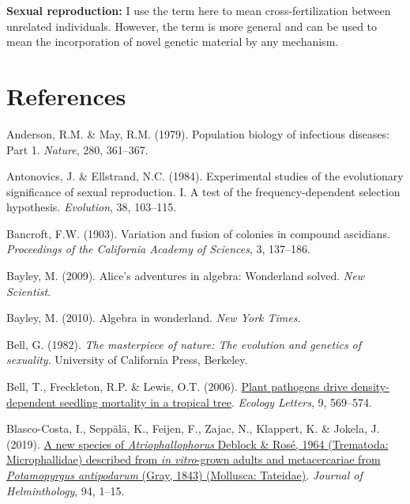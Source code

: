 \documentclass[
  letterpaper,
]{book}
\newlength{\cslhangindent}
\newenvironment{CSLReferences}[2] %
 {\begin{list}{}{%
  \setlength{\itemindent}{0pt}
  \setlength{\leftmargin}{0pt}
  \setlength{\parsep}{0pt}
  \ifodd #1
   \setlength{\leftmargin}{\cslhangindent}
   \setlength{\itemindent}{-1\cslhangindent}
  \fi
  \setlength{\itemsep}{#2\baselineskip}}}
 {\end{list}}
\begin{document}
\textbf{Sexual reproduction:} I use the term here to mean
cross-fertilization between unrelated individuals. However, the term is
more general and can be used to mean the incorporation of novel genetic
material by any mechanism.


\chapter*{References}\label{references}


\label{refs}
\begin{CSLReferences}{1}{0}
Anderson, R.M. \& May, R.M. (1979). Population biology of infectious
diseases: Part 1. \emph{Nature}, 280, 361--367.

Antonovics, J. \& Ellstrand, N.C. (1984). Experimental studies of the
evolutionary significance of sexual reproduction. I. A test of the
frequency-dependent selection hypothesis. \emph{Evolution}, 38,
103--115.

Bancroft, F.W. (1903). Variation and fusion of colonies in compound
ascidians. \emph{Proceedings of the {California Academy of Sciences}},
3, 137--186.

Bayley, M. (2009). Alice's adventures in algebra: Wonderland solved.
\emph{New Scientist}.

Bayley, M. (2010). Algebra in wonderland. \emph{New York Times}.

Bell, G. (1982). \emph{The masterpiece of nature: The evolution and
genetics of sexuality}. University of California Press, Berkeley.

Bell, T., Freckleton, R.P. \& Lewis, O.T. (2006).
\href{https://doi.org/10.1111/j.1461-0248.2006.00905.x}{Plant pathogens
drive density-dependent seedling mortality in a tropical tree}.
\emph{Ecology Letters}, 9, 569--574.

Blasco-Costa, I., Seppälä, K., Feijen, F., Zajac, N., Klappert, K. \&
Jokela, J. (2019). \href{https://doi.org/10.1017/S0022149X19000993}{A
new species of \emph{{A}triophallophorus} {Deblock \& Rosé}, 1964
({Trematoda: Microphallidae}) described from \emph{in vitro}-grown
adults and metacercariae from \emph{{P}otamopyrgus antipodarum} ({G}ray,
1843) ({Mollusca: Tateidae})}. \emph{Journal of Helminthology}, 94,
1--15.


\end{CSLReferences}
\end{document}
